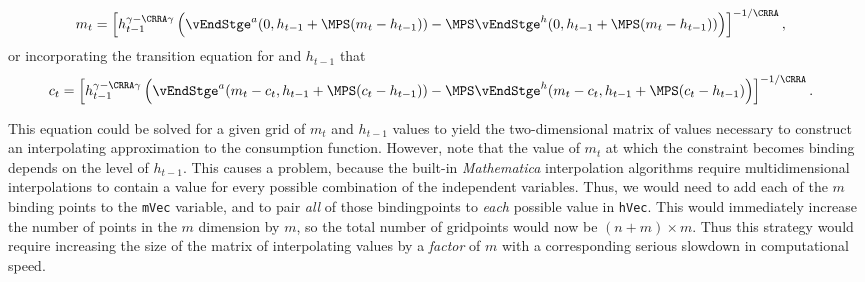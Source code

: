 \documentclass[titlepage, headings=optiontotocandhead]{\econtex}
\newcommand{\Mma}{\textit{Mathematica}}
\begin{document}
{  \begin{equation}\begin{gathered}\begin{aligned}
        {m}_{t}  & = \left[h_{t-1}^{\gamma-\CRRA\gamma} \left(\vEndStge^{{a}}(0,h_{t-1}+\MPS({m}_{t}-h_{t-1}))-\MPS \vEndStge^{h}(0,h_{t-1}+\MPS({m}_{t}-h_{t-1}))\right)  \right]^{-1/\CRRA}, \label{eq:LCbindsHabits}
      \end{aligned}\end{gathered}\end{equation}
  or incorporating the transition equation for
  and $h_{t-1}$ that
  \begin{equation}\begin{gathered}\begin{aligned}
        {c}_{t}  & = \left[h_{t-1}^{\gamma-\CRRA\gamma}
          \left(\vEndStge^{{a}}({m}_{t}-{c}_{t},h_{t-1}+\MPS({c}_{t}-h_{t-1}))
            -\MPS \vEndStge^{h}({m}_{t}-{c}_{t},h_{t-1}+\MPS({c}_{t}-h_{t-1})\right)
        \right]^{-1/\CRRA}. \nonumber
      \end{aligned}\end{gathered}\end{equation}

  This equation could be solved for a given grid of ${m}_{t}$ and
  $h_{t-1}$ values to yield the two-dimensional matrix of values
  necessary to construct an interpolating approximation to the
  consumption function.  However, note that the value of ${m}_{t}$ at
  which the constraint becomes binding depends on the level of
  $h_{t-1}$.  This causes a problem, because the built-in {\Mma}
  interpolation algorithms require multidimensional interpolations to
  contain a value for every possible combination of the independent
  variables.  Thus, we would need to add each of the $m$ binding
  points to the \texttt{mVec} variable, and to pair \textit{all} of
  those bindingpoints to \textit{each} possible value in \texttt{hVec}.
  This would immediately increase the number of points in the ${m}$
  dimension by $m$, so the total number of gridpoints would now be
  $(n+m) \times m$.  Thus this strategy would require increasing the
  size of the matrix of interpolating values by a \textit{factor} of $m$
  with a corresponding serious slowdown in computational speed.

}
\end{document}
